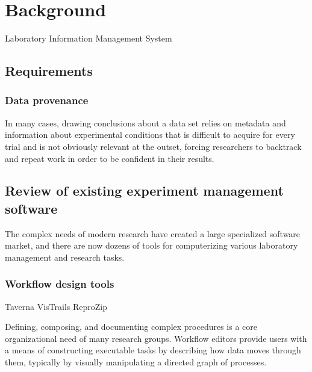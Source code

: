 \chapter{Background}



Laboratory Information Management System



\section{Requirements}

\subsection{Data provenance}
In many cases, drawing conclusions about a data set relies on
metadata and information about experimental conditions that is
difficult to acquire for every trial and is not obviously
relevant at the outset, forcing researchers to backtrack and repeat
work in order to be confident in their results.






\section{Review of existing experiment management software}

The complex needs of modern research have created a large specialized
software market, and there are now dozens of tools for computerizing
various laboratory management and research tasks.

\subsection{Workflow design tools}

Taverna
VisTrails
ReproZip

Defining, composing, and documenting complex procedures is a core
organizational need of many research groups. Workflow editors provide
users with a means of constructing executable tasks by describing how
data moves through them, typically by visually manipulating a directed
graph of processes.


